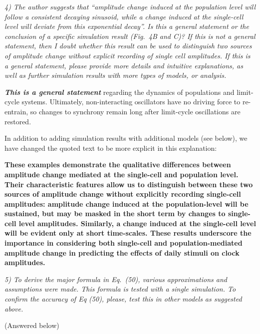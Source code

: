 \documentclass[11pt, letterpaper]{article}
\newenvironment{reviewer}{\itshape\color{gray}}{}
\newenvironment{manuscript}[1]{\begin{center}\begin{tcolorbox}[colback=green!5!white,colframe=green!75!black,width=0.8\textwidth,title={#1},breakable,fonttitle=\bfseries]}{\end{tcolorbox}\end{center}}
\begin{document}
\begin{reviewer}
4) The author suggests that ``amplitude change induced at the population level will follow a consistent decaying sinusoid, while a change induced at the single-cell level will deviate from this exponential decay''.
Is this a general statement or the conclusion of a specific simulation result (Fig.~4B and C)? If this is not a general statement, then I doubt whether this result can be used to distinguish two sources of amplitude change without explicit recording of single cell amplitudes.
If this is a general statement, please provide more details and intuitive explanations, as well as further simulation results with more types of models, or analysis.
\end{reviewer}
 
{\bfseries\itshape This is a general statement} regarding the dynamics of populations and limit-cycle systems. Ultimately, non-interacting oscillators have no driving force to re-entrain, so changes to synchrony remain long after limit-cycle oscillations are restored.

In addition to adding simulation results with additional models (see below), we have changed the quoted text to be more explicit in this explanation:

\begin{manuscript}{Page 14}
  \bfseries
These examples demonstrate the qualitative differences between amplitude change mediated at the single-cell and population level.
Their characteristic features allow us to distinguish between these two sources of amplitude change without explicitly recording single-cell amplitudes: amplitude change induced at the population-level will be sustained, but may be masked in the short term by changes to single-cell level amplitudes.
Similarly, a change induced at the single-cell level will be evident only at short time-scales.
These results underscore the importance in considering both single-cell and population-mediated amplitude change in predicting the effects of daily stimuli on clock amplitudes.
\end{manuscript}

\begin{reviewer}
5) To derive the major formula in Eq.~(50), various approximations and assumptions were made.
This formula is tested with a single simulation.
To confirm the accuracy of Eq (50), please, test this in other models as suggested above.
\end{reviewer}

(Answered below)
\end{document}
